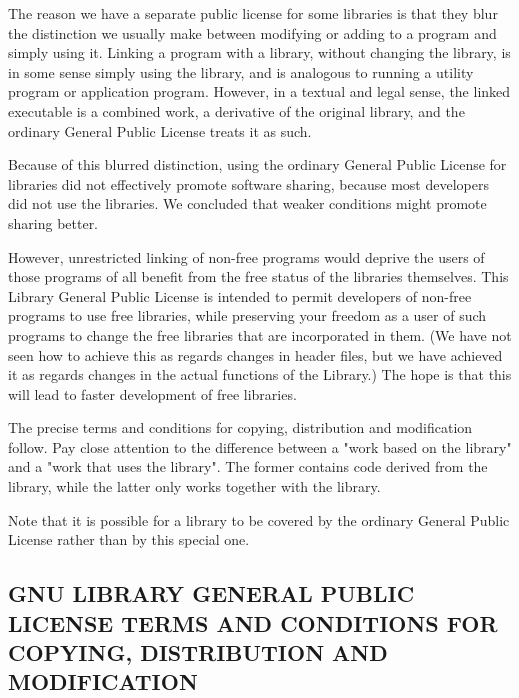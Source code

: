   The reason we have a separate public license for some libraries is that
they blur the distinction we usually make between modifying or adding to a
program and simply using it.  Linking a program with a library, without
changing the library, is in some sense simply using the library, and is
analogous to running a utility program or application program.  However, in
a textual and legal sense, the linked executable is a combined work, a
derivative of the original library, and the ordinary General Public License
treats it as such.

  Because of this blurred distinction, using the ordinary General
Public License for libraries did not effectively promote software
sharing, because most developers did not use the libraries.  We
concluded that weaker conditions might promote sharing better.

  However, unrestricted linking of non-free programs would deprive the
users of those programs of all benefit from the free status of the
libraries themselves.  This Library General Public License is intended to
permit developers of non-free programs to use free libraries, while
preserving your freedom as a user of such programs to change the free
libraries that are incorporated in them.  (We have not seen how to achieve
this as regards changes in header files, but we have achieved it as regards
changes in the actual functions of the Library.)  The hope is that this
will lead to faster development of free libraries.

  The precise terms and conditions for copying, distribution and
modification follow.  Pay close attention to the difference between a
"work based on the library" and a "work that uses the library".  The
former contains code derived from the library, while the latter only
works together with the library.

  Note that it is possible for a library to be covered by the ordinary
General Public License rather than by this special one.

\subsection{GNU LIBRARY GENERAL PUBLIC LICENSE 
   TERMS AND CONDITIONS FOR COPYING, DISTRIBUTION AND MODIFICATION}

